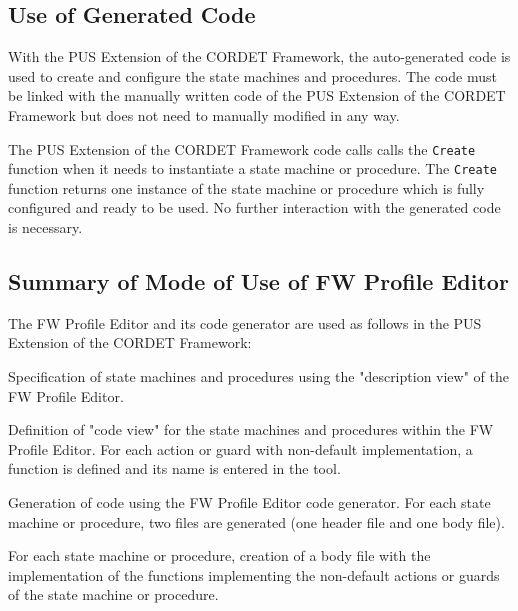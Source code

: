 \documentclass{pnp_article}
\begin{document}
\subsection{Use of Generated Code}
With the PUS Extension of the CORDET Framework, the auto-generated code is used to create and configure the state machines and procedures. The code must be linked with the manually written code of the PUS Extension of the CORDET Framework but does not need to manually modified in any way.  

The PUS Extension of the CORDET Framework code calls calls the \texttt{Create} function when it needs to instantiate a state machine or procedure. The \texttt{Create} function returns one instance of the state machine or procedure which is fully configured and ready to be used. No further interaction with the generated code is necessary.

\subsection{Summary of Mode of Use of FW Profile Editor}
The FW Profile Editor and its code generator are used as follows in the PUS Extension of the CORDET Framework:

\begin{fw_enumerate}
\item Specification of state machines and procedures using the "description view" of the FW Profile Editor. 
\item Definition of "code view" for the state machines and procedures within the FW Profile Editor. For each action or guard with non-default implementation, a function is defined and its name is entered in the tool. 
\item Generation of code using the FW Profile Editor code generator. For each state machine or procedure, two files are generated (one header file and one body file).
\item For each state machine or procedure, creation of a body file with the implementation of the functions implementing the non-default actions or guards of the state machine or procedure.
\end{fw_enumerate}
\end{document}
